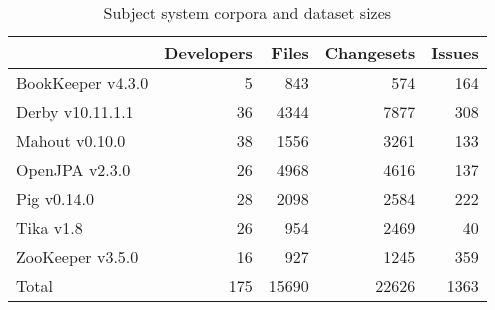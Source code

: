 \begin{table}
\centering
\caption{Subject system corpora and dataset sizes}
\label{table:subjects}
\begin{tabular}{lrrrr}
\toprule
{}                &  Developers &  Files &  Changesets &  Issues \\
\midrule
BookKeeper v4.3.0 &           5 &    843 &         574 &     164 \\
Derby v10.11.1.1  &          36 &   4344 &        7877 &     308 \\
Mahout v0.10.0    &          38 &   1556 &        3261 &     133 \\
OpenJPA v2.3.0    &          26 &   4968 &        4616 &     137 \\
Pig v0.14.0       &          28 &   2098 &        2584 &     222 \\
Tika v1.8         &          26 &    954 &        2469 &      40 \\
ZooKeeper v3.5.0  &          16 &    927 &        1245 &     359 \\
\midrule
Total             &         175 &  15690 &       22626 &    1363 \\
\bottomrule
\end{tabular}
\end{table}
